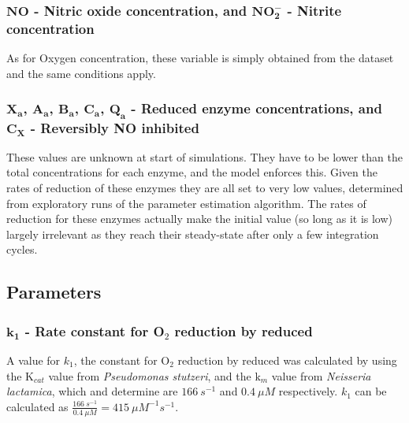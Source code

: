 \subsubsection*{$\mathbf{NO}$ {\bf- Nitric oxide concentration}, and $\mathbf{NO_2^-}$ {\bf- Nitrite concentration}}
As for Oxygen concentration, these variable is simply obtained from the dataset and the same conditions apply.

\subsubsection*{$\mathbf{X_a}$, $\mathbf{A_a}$, $\mathbf{B_a}$, $\mathbf{C_a}$, $\mathbf{Q_a}$ - Reduced enzyme concentrations, and $\mathbf{C_X}$ {\bf- Reversibly NO inhibited \cbbthree{}}}
These values are unknown at start of simulations. They have to be lower than the total concentrations for each enzyme, and the model enforces this. Given the rates of reduction of these enzymes they are all set to very low values, determined from exploratory runs of the parameter estimation algorithm. The rates of reduction for these enzymes actually make the initial value (so long as it is low) largely irrelevant as they reach their steady-state after only a few integration cycles.

\subsection*{Parameters}
\subsubsection*{$\mathbf{k_1}$ {\bf- Rate constant for O$_{\textrm{2}}$ reduction by reduced \cbbthree{}}}

A value for $k_1$, the constant for O$_{\textrm{2}}$ reduction by reduced \cbbthree{} was calculated by using the $\mathrm{K}_{cat}$ value from \textit{Pseudomonas stutzeri}, and the $\textrm{k}_m$ value from \textit{Neisseria lactamica}, which \citet{Forte2001} and \citet{Hunter2007} determine are $166~s^{-1}$ and $0.4~\mu M$ respectively. $k_1$ can be calculated as $\frac{166~s^{-1}}{0.4~\mu M} = 415~\mu M^{-1}s^{-1}$.

